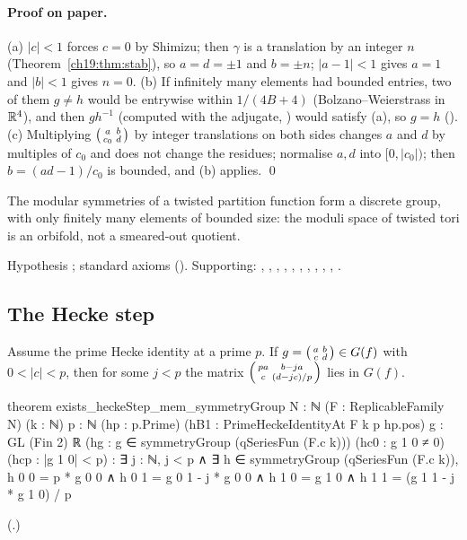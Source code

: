 \paragraph{Proof on paper.}  (a) $|c|<1$ forces $c=0$ by Shimizu; then $\gamma$ is a translation by an integer $n$ (Theorem~\ref{ch19:thm:stab}),
so $a=d=\pm1$ and $b=\pm n$; $|a-1|<1$ gives $a=1$ and $|b|<1$ gives $n=0$.  (b) If infinitely many elements had bounded entries, two of
them $g\ne h$ would be entrywise within $1/(4B+4)$ (Bolzano--Weierstrass in $\mathbb{R}^4$), and then $gh^{-1}$ (computed with the adjugate,
) would satisfy (a), so $g=h$ ().  (c) Multiplying
$\left(\begin{smallmatrix}a&b\\c_0&d\end{smallmatrix}\right)$ by integer translations on both sides changes $a$ and $d$ by multiples of $c_0$ and does not change the residues;
normalise $a,d$ into $[0,|c_0|)$; then $b=(ad-1)/c_0$ is bounded, and (b) applies. \qed
\begin{physics}The modular symmetries of a twisted partition function form a discrete group, with only finitely many elements of
bounded size: the moduli space of twisted tori is an orbifold, not a smeared-out quotient.\end{physics}
\begin{status}Hypothesis ; standard axioms ().  Supporting:
, , , ,
, , ,
, , ,
.\end{status}

\subsection{The Hecke step}

\begin{theorem}\label{ch19:thm:heckestep}
Assume the prime Hecke identity at a prime $p$.  If $g=\left(\begin{smallmatrix}a&b\\c&d\end{smallmatrix}\right)\in G(f)$ with $0<|c|<p$, then for some $j<p$ the matrix
$\left(\begin{smallmatrix}pa&b-ja\\c&(d-jc)/p\end{smallmatrix}\right)$ lies in $G(f)$.
\end{theorem}
\begin{leancode}
theorem exists_heckeStep_mem_symmetryGroup {N : ℕ} (F : ReplicableFamily N) (k : ℕ) {p : ℕ}
    (hp : p.Prime) (hB1 : PrimeHeckeIdentityAt F k p hp.pos) {g : GL (Fin 2) ℝ}
    (hg : g ∈ symmetryGroup (qSeriesFun (F.c k))) (hc0 : g 1 0 ≠ 0) (hcp : |g 1 0| < p) :
    ∃ j : ℕ, j < p ∧ ∃ h ∈ symmetryGroup (qSeriesFun (F.c k)), h 0 0 = p * g 0 0 ∧
      h 0 1 = g 0 1 - j * g 0 0 ∧ h 1 0 = g 1 0 ∧ h 1 1 = (g 1 1 - j * g 1 0) / p
\end{leancode}
(.)
